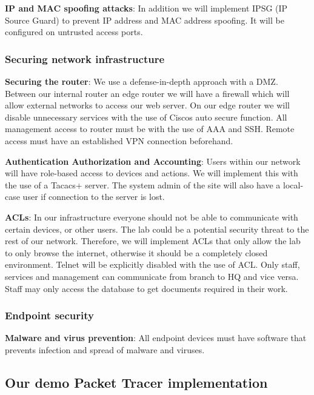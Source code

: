 \textbf{IP and MAC spoofing attacks}: In addition we will implement IPSG (IP Source Guard) to prevent IP address and MAC address spoofing. It will be configured on untrusted access ports.

\subsubsection{Securing network infrastructure}

\textbf{Securing the router}: We use a defense-in-depth approach with a DMZ. Between our internal router an edge router we will have a firewall which will allow external networks to access our web server. On our edge router we will disable unnecessary services with the use of Ciscos auto secure function. All management access to router must be with the use of AAA and SSH. Remote access must have an established VPN connection beforehand.

\textbf{Authentication Authorization and Accounting}: Users within our network will have role-based access to devices and actions. We will implement this with the use of a Tacacs+ server. The system admin of the site will also have a local-case user if connection to the server is lost.

\textbf{ACLs}: In our infrastructure everyone should not be able to communicate with certain devices, or other users. The lab could be a potential security threat to the rest of our network. Therefore, we will implement ACLs that only allow the lab to only browse the internet, otherwise it should be a completely closed environment. Telnet will be explicitly disabled with the use of ACL. Only staff, services and management can communicate from branch to HQ and vice versa. Staff may only access the database to get documents required in their work.

\subsubsection{Endpoint security}

\textbf{Malware and virus prevention}: All endpoint devices must have software that prevents infection and spread of malware and viruses. 

\subsection{Our demo Packet Tracer implementation}


